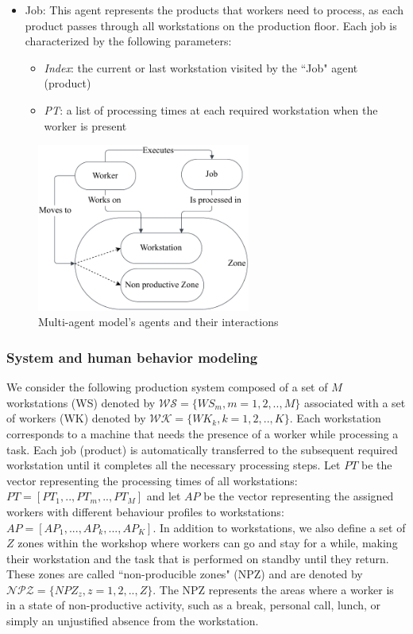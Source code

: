 \documentclass[review,12pt, 3p, times]{elsarticle}
\begin{document}
\begin{itemize}
\begin{itemize}
	      \end{itemize}
	\item Job: This agent represents the products that workers need to process, as each product passes through all workstations on the production floor. Each job is characterized by the following parameters:
	      \begin{itemize}
	      	\item\textit{Index}: the current or last workstation visited by the “Job" agent (product)
	      	\item\textit{PT}: a list of processing times at each required workstation when the worker is present
	      \end{itemize}
\end{itemize}
			      			
\begin{figure}[htbp]
	\centering
	\includegraphics[trim=00 00 00 00, clip, width=7cm]{AgentsInteractions.pdf}
	\caption{Multi-agent model's agents and their interactions}
	
	\label{fig:interaction}
\end{figure}
	
\subsubsection{System and human behavior modeling}
We consider the following production system composed of a set of $M$ workstations (WS) denoted by $\mathcal{W\!S}=\{W\!S_m, m=1,2,..,M\}$ associated with a set of workers (WK) denoted by $\mathcal{W\!K}=\{W\!K_k, k=1,2,..,K\}$.
Each workstation corresponds to a machine that needs the presence of a worker while processing a task. Each job (product) is automatically transferred to the subsequent required workstation until it completes all the necessary processing steps. Let $PT$ be the vector representing the processing times of all workstations:  
$PT=[PT_1,.., PT_m,.., PT_M]$  and let $AP$ be the vector representing the assigned workers with different behaviour profiles to workstations: $AP=[AP_1, ..., AP_k, ..., AP_K]$. 
In addition to workstations, we also define a set of $Z$ zones within the workshop where workers can go and stay for a while, making their workstation and the task that is performed on standby until they return. These zones are called “non-producible zones" (NPZ) and are denoted by $\mathcal{NPZ}=\{N\!P\!Z_z, z=1,2,..,Z\}$. The NPZ represents the areas where a worker is in a state of non-productive activity, such as a break, personal call, lunch, or simply an unjustified absence from the workstation.
\end{document}
